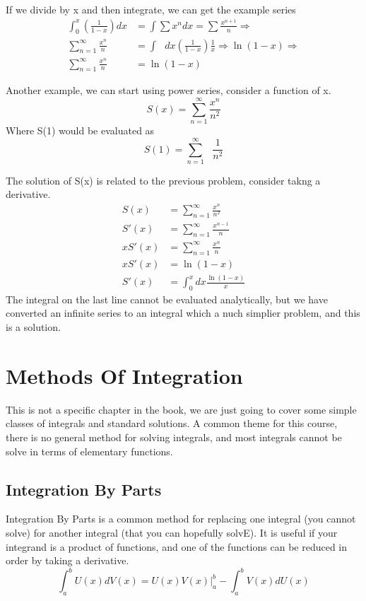 \documentclass{article}
\newcommand{\be}{\begin{equation}}
\newcommand{\ee}{\end{equation}}
\begin{document}
If we divide by x and then integrate, we can get the example series
\be
\begin{split}
	\int_{0}^{x} \left(\frac{1}{1-x}\right) dx &= \int \sum x^n dx = \sum \frac{x^{n+1}}{n} \Rightarrow \\
	\sum_{n=1}^\infty \frac{x^n}{n} &= \int \text{ } dx \left(\frac{1}{1-x}\right) \frac{1}{x} \Rightarrow \ln(1-x) \Rightarrow\\
	\sum_{n=1}^\infty \frac{x^n}{n} &= \ln(1-x)
\end{split}
\ee

Another example, we can start using power series, consider a function of x.
\be
S(x) = \sum_{n=1}^\infty \frac{x^n}{n^2}
\ee
Where S(1) would be evaluated as
\be
S(1) = \sum_{n=1}^\infty \text{ }\frac{1}{n^2}
\ee

The solution of S(x) is related to the previous problem, consider takng a derivative.
\be
\begin{split}
	S(x) &= \sum_{n=1}^\infty \frac{x^n}{n^2}\\
	S'(x) &= \sum_{n=1}^\infty \frac{x^{n-1}}{n}\\
	x S'(x) &= \sum_{n=1}^\infty \frac{x^{n}}{n}\\
	x S'(x) &= \ln(1-x)\\
	S'(x) &= \int_0^x dx \frac{\ln(1-x)}{x}
\end{split}
\ee
The integral on the last line cannot be evaluated analytically, but we have converted an infinite series to an integral which a nuch simplier problem, and this is a solution.

\section*{Methods Of Integration}
This is not a specific chapter in the book, we are just going to cover some simple classes of integrals and standard solutions.
A common theme for this course, there is no general method for solving integrals, and most integrals cannot be solve in terms of elementary functions.

\subsection*{Integration By Parts}
Integration By Parts is a common method for replacing one integral (you cannot solve) for another integral (that you can hopefully solvE).
It is useful if your integrand is a product of functions, and one of the functions can be reduced in order by taking a derivative.
\be
\int_a^b U(x) dV(x) = U(x) V(x) \bigg | _a^b - \int_a^b V(x) dU(x)
\ee
\end{document}
